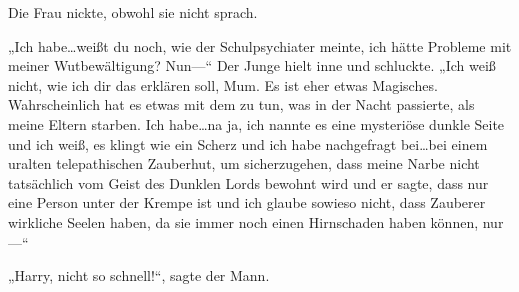 Die Frau nickte, obwohl sie nicht sprach.

„Ich habe…weißt du noch, wie der Schulpsychiater meinte, ich hätte Probleme mit meiner Wutbewältigung? Nun—“ Der Junge hielt inne und schluckte. „Ich weiß nicht, wie ich dir das erklären soll, Mum. Es ist eher etwas Magisches. Wahrscheinlich hat es etwas mit dem zu tun, was in der Nacht passierte, als meine Eltern starben. Ich habe…na ja, ich nannte es eine mysteriöse dunkle Seite und ich weiß, es klingt wie ein Scherz und ich habe nachgefragt bei…bei einem uralten telepathischen Zauberhut, um sicherzugehen, dass meine Narbe nicht tatsächlich vom Geist des Dunklen Lords bewohnt wird und er sagte, dass nur eine Person unter der Krempe ist und ich glaube sowieso nicht, dass Zauberer wirkliche Seelen haben, da sie immer noch einen Hirnschaden haben können, nur—“

„Harry, nicht so schnell!“, sagte der Mann.


